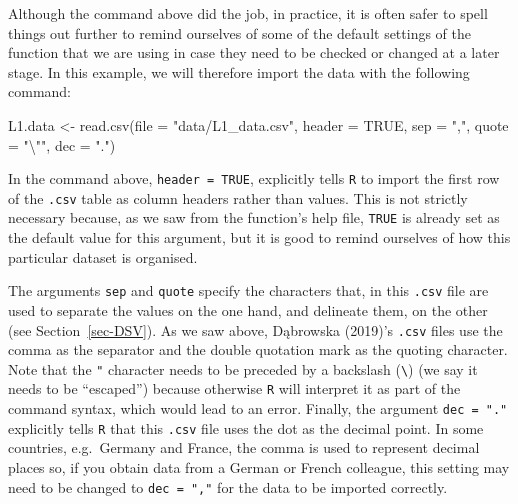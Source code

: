 \documentclass[
  letterpaper,
  DIV=11,
  numbers=noendperiod]{scrreprt}
\newenvironment{Shaded}{\begin{snugshade}}{\end{snugshade}}
\newcommand{\AttributeTok}[1]{\textcolor[rgb]{0.40,0.45,0.13}{#1}}
\newcommand{\ConstantTok}[1]{\textcolor[rgb]{0.56,0.35,0.01}{#1}}
\newcommand{\FunctionTok}[1]{\textcolor[rgb]{0.28,0.35,0.67}{#1}}
\newcommand{\NormalTok}[1]{\textcolor[rgb]{0.00,0.23,0.31}{#1}}
\newcommand{\OtherTok}[1]{\textcolor[rgb]{0.00,0.23,0.31}{#1}}
\newcommand{\SpecialCharTok}[1]{\textcolor[rgb]{0.37,0.37,0.37}{#1}}
\newcommand{\StringTok}[1]{\textcolor[rgb]{0.13,0.47,0.30}{#1}}
\begin{document}
Although the command above did the job, in practice, it is often safer
to spell things out further to remind ourselves of some of the default
settings of the function that we are using in case they need to be
checked or changed at a later stage. In this example, we will therefore
import the data with the following command:

\begin{Shaded}
\begin{Highlighting}[]
\NormalTok{L1.data }\OtherTok{\textless{}{-}} \FunctionTok{read.csv}\NormalTok{(}\AttributeTok{file =} \StringTok{"data/L1\_data.csv"}\NormalTok{,}
                    \AttributeTok{header =} \ConstantTok{TRUE}\NormalTok{,}
                    \AttributeTok{sep =} \StringTok{","}\NormalTok{,}
                    \AttributeTok{quote =} \StringTok{"}\SpecialCharTok{\textbackslash{}"}\StringTok{"}\NormalTok{,}
                    \AttributeTok{dec =} \StringTok{"."}\NormalTok{)}
\end{Highlighting}
\end{Shaded}

In the command above, \texttt{header\ =\ TRUE}, explicitly tells
\texttt{R} to import the first row of the \texttt{.csv} table as column
headers rather than values. This is not strictly necessary because, as
we saw from the function's help file, \texttt{TRUE} is already set as
the default value for this argument, but it is good to remind ourselves
of how this particular dataset is organised.

The arguments \texttt{sep} and \texttt{quote} specify the characters
that, in this \texttt{.csv} file are used to separate the values on the
one hand, and delineate them, on the other (see Section~\ref{sec-DSV}).
As we saw above, Dąbrowska (2019)'s \texttt{.csv} files use the comma as
the separator and the double quotation mark as the quoting character.
Note that the \texttt{"} character needs to be preceded by a backslash
(\texttt{\textbackslash{}}) (we say it needs to be ``escaped'') because
otherwise \texttt{R} will interpret it as part of the command syntax,
which would lead to an error. Finally, the argument \texttt{dec\ =\ "."}
explicitly tells \texttt{R} that this \texttt{.csv} file uses the dot as
the decimal point. In some countries, e.g.~Germany and France, the comma
is used to represent decimal places so, if you obtain data from a German
or French colleague, this setting may need to be changed to
\texttt{dec\ =\ ","} for the data to be imported correctly.
\end{document}
